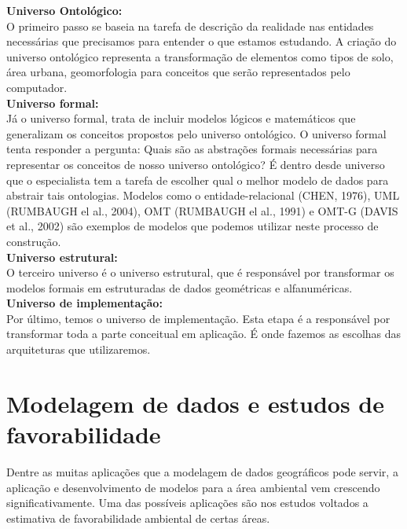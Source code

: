 	

	\textbf{Universo Ontológico:} \\

	O primeiro passo se baseia na tarefa de descrição da realidade nas entidades necessárias que precisamos para entender o que estamos estudando.  A criação do universo ontológico representa a transformação de elementos como tipos de solo, área urbana, geomorfologia para conceitos que serão representados pelo computador. \\
	
	\textbf{Universo formal:} \\
		
	Já o universo formal, trata de incluir modelos lógicos e matemáticos que generalizam os conceitos propostos pelo universo ontológico. O universo formal tenta responder a pergunta: Quais são as abstrações formais necessárias para representar os conceitos de nosso universo ontológico? É dentro desde universo que o especialista tem a tarefa de escolher qual o melhor modelo de dados para abstrair tais ontologias. Modelos como o entidade-relacional (CHEN, 1976)\cite{CHEN}, UML (RUMBAUGH el al., 2004)\cite{RUMBAUGH_etal04}, OMT (RUMBAUGH el al., 1991)\cite{RUMBAUGH_etal91} e OMT-G (DAVIS et al., 2002)\cite{DAVIS_etal02} são exemplos de modelos que podemos utilizar neste processo de construção. \\
	
	\textbf{Universo estrutural:} \\
	
	O terceiro universo é o universo estrutural, que é responsável por transformar os modelos formais em estruturadas de dados geométricas e alfanuméricas. \\
	
	\textbf{Universo de implementação:} \\
	
	 Por último, temos o universo de implementação. Esta etapa é a responsável por transformar toda a parte conceitual em aplicação. É onde fazemos as escolhas das arquiteturas que utilizaremos.
	 
	 \section{Modelagem de dados e estudos de favorabilidade}
	 
	 Dentre as muitas aplicações que a modelagem de dados geográficos pode servir, a aplicação e desenvolvimento de modelos para a área ambiental vem crescendo significativamente.  Uma das possíveis aplicações são nos estudos voltados a estimativa de favorabilidade ambiental de certas áreas.
	 
